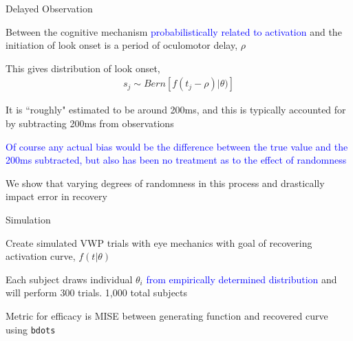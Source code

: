 \documentclass{beamer}
\newcommand{\vp}{\vspace{2mm}}
\newcommand{\xt}{\texttt}
\providecommand{\cn}[1]{\textcolor{blue}{#1}}
\begin{document}
\begin{frame}{Delayed Observation}\large

Between the cognitive mechanism \cn{probabilistically related to activation} and the initiation of look onset is a period of oculomotor delay, $\rho$ \vp

This gives distribution of look onset,
\vspace{-1mm}
\begin{align*}
s_j \sim Bern \left[f(t_j - \rho) | \theta)\right]
\end{align*}

It is ``roughly" estimated to be around 200ms, and this is typically accounted for by subtracting 200ms from observations \vp

\cn{Of course any actual bias would be the difference between the true value and the 200ms subtracted, but also has been no treatment as to the effect of randomness} \vp

We show that varying degrees of randomness in this process and drastically impact error in recovery

\end{frame}
%
%
%
%
%
%

\begin{frame}{Simulation}\Large

Create simulated VWP trials with eye mechanics with goal of recovering activation curve, $f(t|\theta)$ \vp \vp

Each subject draws individual $\theta_i$ \cn{from empirically determined distribution} and will perform 300 trials. 1,000 total subjects \vp \vp

Metric for efficacy is MISE between generating function and recovered curve using \xt{bdots}
\end{frame}
\end{document}
